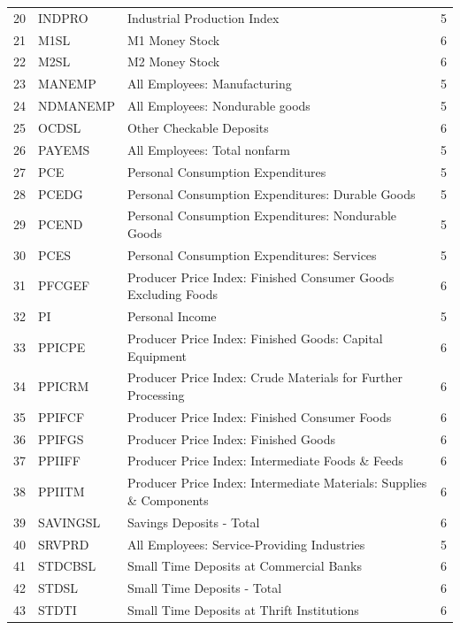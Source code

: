 \documentclass[12pt,letterpaper,leqno,doublespacing]{article}
\begin{document}
\begin{appendices}
{{\begin{tabularx}{\textwidth}{llZc}
            20 & INDPRO & Industrial Production Index & 5 \\
            21 & M1SL & M1 Money Stock & 6 \\
            22 & M2SL & M2 Money Stock & 6 \\
            23 & MANEMP & All Employees: Manufacturing & 5 \\
            24 & NDMANEMP & All Employees: Nondurable goods & 5 \\
            25 & OCDSL & Other Checkable Deposits & 6 \\
            26 & PAYEMS & All Employees: Total nonfarm & 5 \\
            27 & PCE & Personal Consumption Expenditures & 5 \\
            28 & PCEDG & Personal Consumption Expenditures: Durable Goods & 5 \\
            29 & PCEND & Personal Consumption Expenditures: Nondurable Goods & 5 \\
            30 & PCES & Personal Consumption Expenditures: Services & 5 \\
            31 & PFCGEF & Producer Price Index: Finished Consumer Goods Excluding Foods & 6 \\
            32 & PI & Personal Income & 5 \\
            33 & PPICPE & Producer Price Index: Finished Goods: Capital Equipment & 6 \\
            34 & PPICRM & Producer Price Index: Crude Materials for Further Processing & 6 \\
            35 & PPIFCF & Producer Price Index: Finished Consumer Foods & 6 \\
            36 & PPIFGS & Producer Price Index: Finished Goods & 6 \\
            37 & PPIIFF & Producer Price Index: Intermediate Foods \& Feeds & 6 \\
            38 & PPIITM & Producer Price Index: Intermediate Materials: Supplies \& Components & 6 \\
            39 & SAVINGSL & Savings Deposits - Total & 6 \\
            40 & SRVPRD & All Employees: Service-Providing Industries & 5 \\
            41 & STDCBSL & Small Time Deposits at Commercial Banks & 6 \\
            42 & STDSL & Small Time Deposits - Total & 6 \\
            43 & STDTI & Small Time Deposits at Thrift Institutions & 6 \\

\end{tabularx}}}
\end{appendices}
\end{document}
